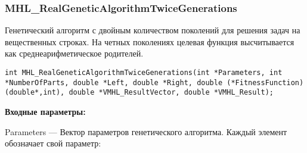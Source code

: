 \documentclass[a4paper,12pt]{article}
\begin{document}
\subsubsection{MHL\_RealGeneticAlgorithmTwiceGenerations}\label{MHL_RealGeneticAlgorithmTwiceGenerations}

Генетический алгоритм с двойным количеством поколений для решения задач на вещественных строках. На четных поколениях целевая функция высчитывается как среднеарифметическое родителей.


\begin{lstlisting}[label=code_syntax_MHL_RealGeneticAlgorithmTwiceGenerations,caption=Синтаксис]
int MHL_RealGeneticAlgorithmTwiceGenerations(int *Parameters, int *NumberOfParts, double *Left, double *Right, double (*FitnessFunction)(double*,int), double *VMHL_ResultVector, double *VMHL_Result);
\end{lstlisting}

\textbf{Входные параметры:}
 
Parameters --- Вектор параметров генетического алгоритма. Каждый элемент обозначает свой параметр:
 
\end{document}
